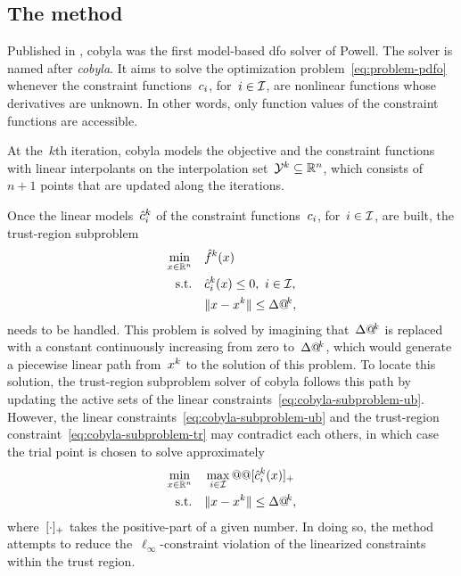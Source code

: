 \subsection{The  method}
\label{subsec:cobyla}

Published in , \gls{cobyla} was the first model-based \gls{dfo} solver of Powell.
The solver is named after \emph{\glsdesc{cobyla}}.
It aims to solve the optimization problem~\cref{eq:problem-pdfo} whenever the constraint functions~$c_{i}$, for~$i \in \mathcal{I}$, are nonlinear functions whose derivatives are unknown.
In other words, only function values of the constraint functions are accessible.

At the~$k$th iteration, \gls{cobyla} models the objective and the constraint functions with linear interpolants on the interpolation set~$\xpt[k] \subseteq \R^n$, which consists of~$n + 1$ points that are updated along the iterations.

Once the linear models~$\conm[k]{i}$ of the constraint functions~$c_{i}$, for~$i \in \mathcal{I}$, are built, the trust-region subproblem
\begin{subequations}
    \label{eq:cobyla-subproblem}
    \begin{align}
        \min_{\iter \in \R^n}   & \quad \objm[k](\iter)\\
        \text{s.t.}             & \quad \conm[k]{i}(\iter) \le 0, ~ i \in \iub, \label{eq:cobyla-subproblem-ub}\\
                                & \quad \norm{\iter - \iter[k]} \le \rad[k], \label{eq:cobyla-subproblem-tr}
    \end{align}
\end{subequations}
needs to be handled.
This problem is solved by imagining that~$\rad[k]$ is replaced with a constant continuously increasing from zero to~$\rad[k]$, which would generate a piecewise linear path from~$\iter[k]$ to the solution of this problem.
To locate this solution, the trust-region subproblem solver of \gls{cobyla} follows this path by updating the active sets of the linear constraints~\cref{eq:cobyla-subproblem-ub}.
However, the linear constraints~\cref{eq:cobyla-subproblem-ub} and the trust-region constraint~\cref{eq:cobyla-subproblem-tr} may contradict each others, in which case the trial point is chosen to solve approximately
\begin{align*}
    \min_{\iter \in \R^n}   & \quad \max_{i \in \iub} @@ \posp{\conm[k]{i}(\iter)}\\
    \text{s.t.}             & \quad \norm{\iter - \iter[k]} \le \rad[k],
\end{align*}
%
where~$[\cdot]_+$ takes the positive-part of a given number.
In doing so, the method attempts to reduce the~$\ell_{\infty}$-constraint violation of the linearized constraints within the trust region.

